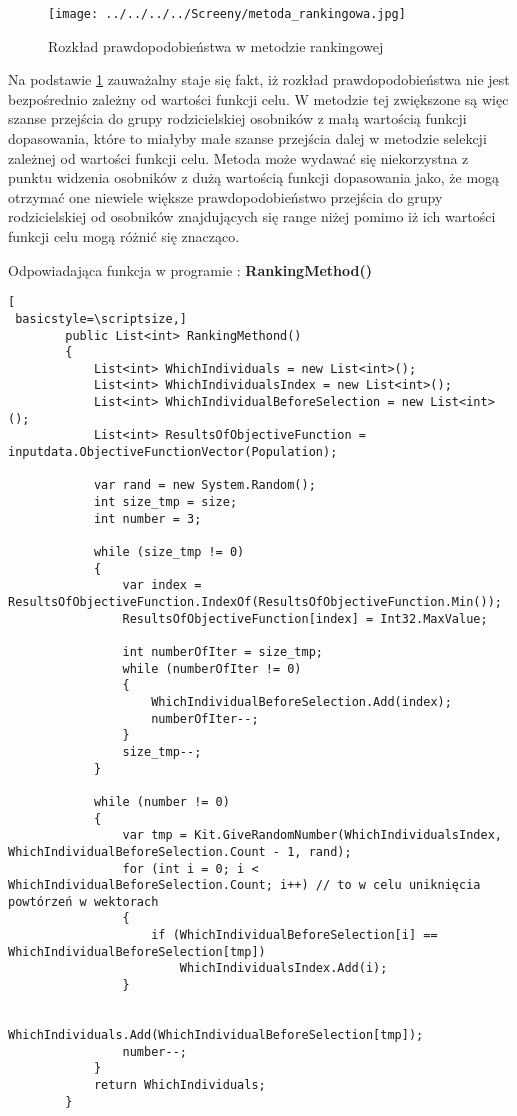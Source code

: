 \begin{figure}[h]
		\texttt{[image: ../../../../Screeny/metoda\_rankingowa.jpg]}
		\caption{Rozkład prawdopodobieństwa w metodzie rankingowej}
		\label{ranking}			
\end{figure}
\par
Na podstawie \ref{ranking} zauważalny staje się fakt, iż rozkład prawdopodobieństwa nie jest bezpośrednio zależny od wartości funkcji celu. W metodzie tej zwiększone są więc szanse przejścia do grupy rodzicielskiej osobników z małą wartością funkcji dopasowania, które to miałyby małe szanse przejścia dalej w metodzie selekcji zależnej od wartości funkcji celu. Metoda może wydawać się niekorzystna z punktu widzenia osobników z dużą wartością funkcji dopasowania jako, że mogą otrzymać one niewiele większe prawdopodobieństwo przejścia do grupy rodzicielskiej od osobników znajdujących się range niżej pomimo iż ich wartości funkcji celu mogą różnić się znacząco.
\par
\vspace{0,4cm}
Odpowiadająca funkcja w programie : \textbf{RankingMethod()}
\begin{program}
\begin{lstlisting}[
 basicstyle=\scriptsize,]
        public List<int> RankingMethond()
        {
            List<int> WhichIndividuals = new List<int>();
            List<int> WhichIndividualsIndex = new List<int>();
            List<int> WhichIndividualBeforeSelection = new List<int>();
            List<int> ResultsOfObjectiveFunction = inputdata.ObjectiveFunctionVector(Population);

            var rand = new System.Random();
            int size_tmp = size;
            int number = 3;

            while (size_tmp != 0)
            {
                var index = ResultsOfObjectiveFunction.IndexOf(ResultsOfObjectiveFunction.Min());
                ResultsOfObjectiveFunction[index] = Int32.MaxValue;

                int numberOfIter = size_tmp;
                while (numberOfIter != 0)
                {
                    WhichIndividualBeforeSelection.Add(index);
                    numberOfIter--;
                }
                size_tmp--;
            }

            while (number != 0)
            {
                var tmp = Kit.GiveRandomNumber(WhichIndividualsIndex, WhichIndividualBeforeSelection.Count - 1, rand);
                for (int i = 0; i < WhichIndividualBeforeSelection.Count; i++) // to w celu uniknięcia powtórzeń w wektorach
                {
                    if (WhichIndividualBeforeSelection[i] == WhichIndividualBeforeSelection[tmp])
                        WhichIndividualsIndex.Add(i);
                }

                WhichIndividuals.Add(WhichIndividualBeforeSelection[tmp]);
                number--;
            }
            return WhichIndividuals;
        }
\end{lstlisting}
\end{program}


